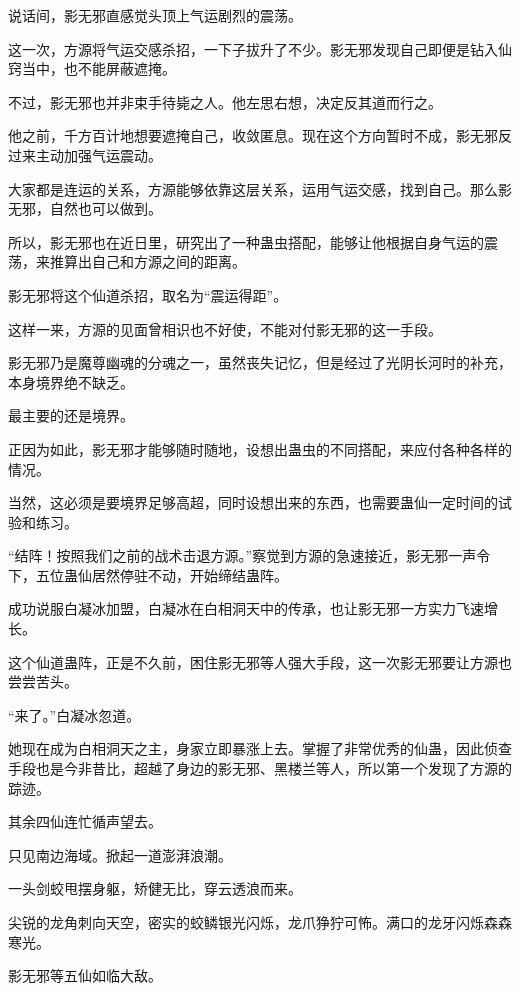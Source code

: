 
\begin{this_body}

说话间，影无邪直感觉头顶上气运剧烈的震荡。

这一次，方源将气运交感杀招，一下子拔升了不少。影无邪发现自己即便是钻入仙窍当中，也不能屏蔽遮掩。

不过，影无邪也并非束手待毙之人。他左思右想，决定反其道而行之。

他之前，千方百计地想要遮掩自己，收敛匿息。现在这个方向暂时不成，影无邪反过来主动加强气运震动。

大家都是连运的关系，方源能够依靠这层关系，运用气运交感，找到自己。那么影无邪，自然也可以做到。

所以，影无邪也在近日里，研究出了一种蛊虫搭配，能够让他根据自身气运的震荡，来推算出自己和方源之间的距离。

影无邪将这个仙道杀招，取名为“震运得距”。

这样一来，方源的见面曾相识也不好使，不能对付影无邪的这一手段。

影无邪乃是魔尊幽魂的分魂之一，虽然丧失记忆，但是经过了光阴长河时的补充，本身境界绝不缺乏。

最主要的还是境界。

正因为如此，影无邪才能够随时随地，设想出蛊虫的不同搭配，来应付各种各样的情况。

当然，这必须是要境界足够高超，同时设想出来的东西，也需要蛊仙一定时间的试验和练习。

“结阵！按照我们之前的战术击退方源。”察觉到方源的急速接近，影无邪一声令下，五位蛊仙居然停驻不动，开始缔结蛊阵。

成功说服白凝冰加盟，白凝冰在白相洞天中的传承，也让影无邪一方实力飞速增长。

这个仙道蛊阵，正是不久前，困住影无邪等人强大手段，这一次影无邪要让方源也尝尝苦头。

“来了。”白凝冰忽道。

她现在成为白相洞天之主，身家立即暴涨上去。掌握了非常优秀的仙蛊，因此侦查手段也是今非昔比，超越了身边的影无邪、黑楼兰等人，所以第一个发现了方源的踪迹。

其余四仙连忙循声望去。

只见南边海域。掀起一道澎湃浪潮。

一头剑蛟甩摆身躯，矫健无比，穿云透浪而来。

尖锐的龙角刺向天空，密实的蛟鳞银光闪烁，龙爪狰狞可怖。满口的龙牙闪烁森森寒光。

影无邪等五仙如临大敌。


\end{this_body}
